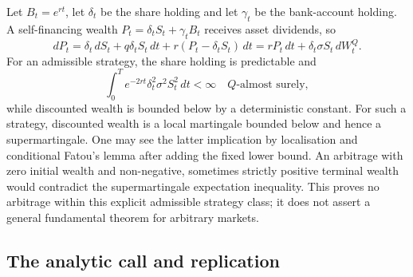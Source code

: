 \documentclass[11pt]{article}
\begin{document}
Let $B_t=e^{rt}$, let $\delta_t$ be the share holding and let $\gamma_t$
be the bank-account holding. A self-financing wealth $P_t=\delta_tS_t+
\gamma_tB_t$ receives asset dividends, so
\begin{equation}
 dP_t=\delta_t\,dS_t+q\delta_tS_t\,dt+
 r(P_t-\delta_tS_t)\,dt
 =rP_t\,dt+\delta_t\sigma S_t\,dW_t^Q.
 \label{eq:cgbm-self-financing}
\end{equation}
For an admissible strategy, the share holding is predictable and
\begin{equation}
 \int_0^T e^{-2rt}\delta_t^2\sigma^2S_t^2\,dt<\infty
 \quad Q\text{-almost surely},\label{eq:cgbm-admissible-integrand}
\end{equation}
while discounted wealth is bounded below by a deterministic constant. For such a strategy, discounted
wealth is a local martingale bounded below and hence a supermartingale.
One may see the latter implication by localisation and conditional
Fatou's lemma after adding the fixed lower bound. An arbitrage with zero
initial wealth and non-negative, sometimes strictly positive terminal
wealth would contradict the supermartingale expectation inequality.
This proves no arbitrage within this explicit admissible strategy class;
it does not assert a general fundamental theorem for arbitrary markets.

\subsection{The analytic call and replication}
\end{document}
